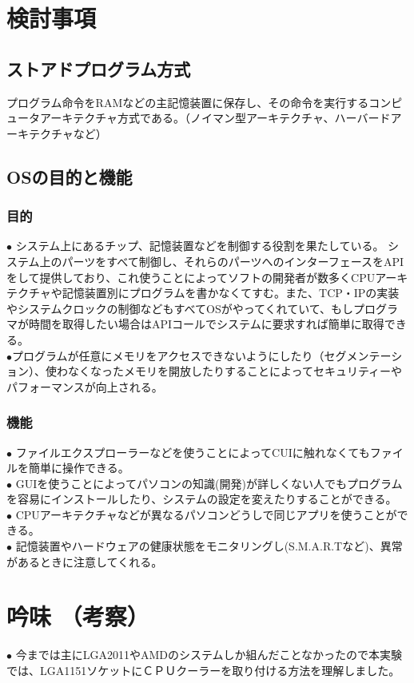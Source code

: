 \documentclass[10pt]{article}
\begin{document}
\section{検討事項}
\subsection{ストアドプログラム方式}
\hspace{1cm} プログラム命令をRAMなどの主記憶装置に保存し、その命令を実行するコンピュータアーキテクチャ方式である。（ノイマン型アーキテクチャ、ハーバードアーキテクチャなど）
\subsection{OSの目的と機能}
\subsubsection{目的}
$\bullet$ システム上にあるチップ、記憶装置などを制御する役割を果たしている。 システム上のパーツをすべて制御し、それらのパーツへのインターフェースをAPIをして提供しており、これ使うことによってソフトの開発者が数多くCPUアーキテクチャや記憶装置別にプログラムを書かなくてすむ。また、TCP・IPの実装やシステムクロックの制御などもすべてOSがやってくれていて、もしプログラマが時間を取得したい場合はAPIコールでシステムに要求すれば簡単に取得できる。\\
$\bullet$プログラムが任意にメモリをアクセスできないようにしたり（セグメンテーション）、使わなくなったメモリを開放したりすることによってセキュリティーやパフォーマンスが向上される。

\subsubsection{機能}
$\bullet$ ファイルエクスプローラーなどを使うことによってCUIに触れなくてもファイルを簡単に操作できる。\\
$\bullet$ GUIを使うことによってパソコンの知識(開発)が詳しくない人でもプログラムを容易にインストールしたり、システムの設定を変えたりすることができる。\\
$\bullet$ CPUアーキテクチャなどが異なるパソコンどうしで同じアプリを使うことができる。\\
$\bullet$ 記憶装置やハードウェアの健康状態をモニタリングし(S.M.A.R.Tなど)、異常があるときに注意してくれる。

\section{吟味 （考察）}
$\bullet$ 今までは主にLGA2011やAMDのシステムしか組んだことなかったので本実験では、LGA1151ソケットにＣＰＵクーラーを取り付ける方法を理解しました。
\end{document}
